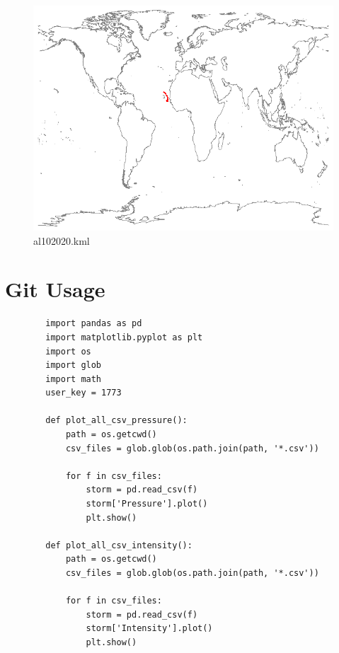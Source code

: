 \documentclass[]{article}
\begin{document}
\begin{figure}[htbp]
    \centering
\includegraphics{al102020.png}
\caption{al102020.kml}
\label{fig:al102020}
\end{figure}
\clearpage
\section{Git Usage}
\begin{tcolorbox}[enhanced, 
    listing only,
    title=Python Code for Plotting CSV Data,
    fonttitle=\bfseries,
    colback=white,
    colframe=black!70,
    listing options={
      language=Python,
      numbers=left, 
      numberstyle=\tiny\color{gray},
      breaklines=true, 
      basicstyle=\ttfamily\small, 
      columns=fullflexible,
      keepspaces=true,
      showstringspaces=true,
    },]
    \begin{verbatim}
        import pandas as pd
        import matplotlib.pyplot as plt
        import os
        import glob
        import math
        user_key = 1773
        
        def plot_all_csv_pressure():
            path = os.getcwd()
            csv_files = glob.glob(os.path.join(path, '*.csv'))
            
            for f in csv_files:
                storm = pd.read_csv(f)
                storm['Pressure'].plot()
                plt.show()
        
        def plot_all_csv_intensity():
            path = os.getcwd()
            csv_files = glob.glob(os.path.join(path, '*.csv'))
            
            for f in csv_files:
                storm = pd.read_csv(f)
                storm['Intensity'].plot()
                plt.show()
    \end{verbatim}
\end{tcolorbox}
\end{document}

